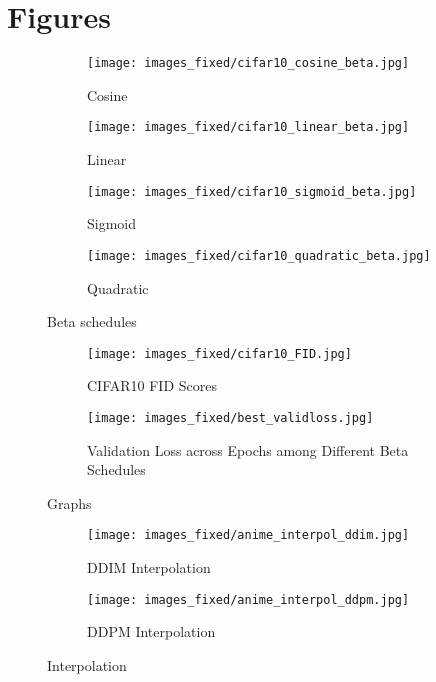 \documentclass[10pt,twocolumn,letterpaper]{article}
\begin{document}
\section{Figures}
\begin{figure}[H]
    \centering
    \begin{subfigure}[b]{0.2\textwidth}
        \centering
        \texttt{[image: images\_fixed/cifar10\_cosine\_beta.jpg]}
        \caption{Cosine}
        \label{subfig:cosine_beta}
    \end{subfigure}
    \hfill
    \begin{subfigure}[b]{0.2\textwidth}
        \centering
        \texttt{[image: images\_fixed/cifar10\_linear\_beta.jpg]}
        \caption{Linear}
        \label{subfig:linear_beta}
    \end{subfigure}
    \hfill
    \begin{subfigure}[b]{0.2\textwidth}
        \centering
        \texttt{[image: images\_fixed/cifar10\_sigmoid\_beta.jpg]}
        \caption{Sigmoid}
        \label{subfig:sigmoid_beta}
    \end{subfigure}
    \hfill
    \begin{subfigure}[b]{0.2\textwidth}
        \centering
        \texttt{[image: images\_fixed/cifar10\_quadratic\_beta.jpg]}
        \caption{Quadratic}
        \label{subfig:quadratic_beta}
    \end{subfigure}
    \caption{Beta schedules}
    \label{fig:beta_schedules}
\end{figure}
\begin{figure}[H]
    \centering
    \begin{subfigure}[b]{0.22\textwidth}
        \centering
        \texttt{[image: images\_fixed/cifar10\_FID.jpg]}
        \caption{CIFAR10 FID Scores}
        \label{subfig:cifar10_fid}
    \end{subfigure}
    \hfill
    \begin{subfigure}[b]{0.22\textwidth}
        \centering
        \texttt{[image: images\_fixed/best\_validloss.jpg]}
        \caption{Validation Loss across Epochs among Different Beta Schedules}
        \label{subfig:validloss}
    \end{subfigure}
    \caption{Graphs}
    \label{fig:fidscores}
\end{figure}
\begin{figure}[H]
    \centering
    \begin{subfigure}[b]{0.22\textwidth}
        \centering
        \texttt{[image: images\_fixed/anime\_interpol\_ddim.jpg]}
        \caption{DDIM Interpolation}
        \label{subfig:ddim_interpol}
    \end{subfigure}
    \hfill
    \begin{subfigure}[b]{0.22\textwidth}
        \centering
        \texttt{[image: images\_fixed/anime\_interpol\_ddpm.jpg]}
        \caption{DDPM Interpolation}
        \label{subfig:ddpm_interpol}
    \end{subfigure}
    \caption{Interpolation}
    \label{fig:interpol}
\end{figure}
\end{document}
